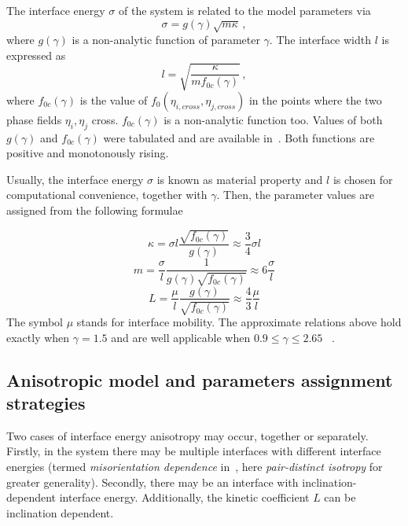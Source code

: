 	The interface energy $\sigma$ of the system is related to the model parameters via 
	\begin{equation}\label{eq_IE}
		\sigma = g(\gamma)\sqrt{m\kappa} \,,
	\end{equation}
	where $g(\gamma)$ is a non-analytic function of parameter $\gamma$. The interface width $l$ is expressed as
	\begin{equation} \label{eq_IW}
		l = \sqrt{\frac{\kappa}{mf_{0c}(\gamma)}} \,,
	\end{equation}
	where $f_{0c}(\gamma)$ is the value of $f_0(\eta_{i,cross},\eta_{j,cross})$ in the points where the two phase fields $\eta_i,\eta_j$ cross. $f_{0c}(\gamma)$ is a non-analytic function too. Values of both $g(\gamma)$ and $f_{0c}(\gamma)$ were tabulated and are available in~\cite{Ravash2017}. Both functions are positive and monotonously rising.
	
	Usually, the interface energy $\sigma$ is known as material property and $l$ is chosen for computational convenience, together with $\gamma$. Then, the parameter values are assigned from the following formulae
	
	\begin{equation}\label{eq_def_kappa}
		\kappa = \sigma l\frac{\sqrt{f_{0c}(\gamma)}}{g(\gamma)} \approx \frac{3}{4}\sigma l
	\end{equation}
	\begin{equation} \label{eq_def_m}
		m = \frac{\sigma}{l}\frac{1}{g(\gamma)\sqrt{f_{0c}(\gamma)}} \approx 6 \frac{\sigma}{l}
	\end{equation}
	\begin{equation}\label{eq_def_L}
		L = \frac{\mu}{l}\frac{g(\gamma)}{\sqrt{f_{0c}(\gamma)}} \approx \frac{4}{3} \frac{\mu}{l}
	\end{equation}
	The symbol $\mu$ stands for interface mobility. The approximate relations above hold exactly when $\gamma=1.5$ and are well applicable when $0.9 \leq \gamma \leq 2.65$ ~\cite{Moelans2008}. 
	
	\subsection{Anisotropic model and parameters assignment strategies}
	Two cases of interface energy anisotropy may occur, together or separately. Firstly, in the system there may be multiple interfaces with different interface energies (termed \textit{misorientation dependence} in~\cite{Moelans2008}, here \textit{pair-distinct isotropy} for greater generality). Secondly, there may be an interface with inclination-dependent interface energy. Additionally, the kinetic coefficient $L$ can be inclination dependent. 
	
